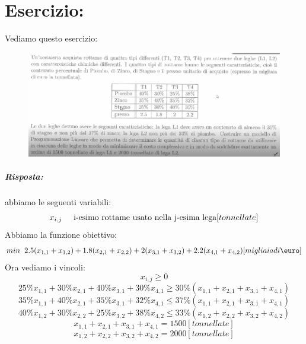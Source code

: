 \section{Esercizio:} 
Vediamo questo esercizio:
\begin{figure}[h!]
    \centering
    \includegraphics[scale=0.5]{Esercizietto.png}
\end{figure}

\subparagraph{Risposta:}
abbiamo le seguenti variabili:
\begin{equation*}
    x_{i,j} \hspace{0.5cm} \text{i-esimo rottame usato nella j-esima lega} [tonnellate]
\end{equation*}
Abbiamo la funzione obiettivo:
\begin{equation*}
    min \hspace{0.2cm} 2.5(x_{1,1} + x_{1,2}) + 1.8(x_{2,1} + x_{2,2}) + 2(x_{3,1} + x_{3,2}) + 2.2(x_{4,1} + x_{4,2}) [migliaia di \euro] 
\end{equation*}
Ora vediamo i vincoli:
\begin{equation*}
    x_{i,j} \geq 0
\end{equation*}
\begin{equation*}
    25\%x_{1,1} + 30\%x_{2,1} + 40\%x_{3,1} + 30\%x_{4,1} \geq 30\%(x_{1,1} + x_{2,1} + x_{3,1} + x_{4,1}) 
\end{equation*}
\begin{equation*}
    35\%x_{1,1} + 40\%x_{2,1} + 35\%x_{3,1} + 32\%x_{4,1} \leq 37\%(x_{1,1} + x_{2,1} + x_{3,1} + x_{4,1}) 
\end{equation*}
\begin{equation*}
    40\%x_{1,2} + 30\%x_{2,2} + 25\%x_{3,2} + 38\%x_{4,2} \leq 33\%(x_{1,2} + x_{2,2} + x_{3,2} + x_{4,2}) 
\end{equation*}
\begin{equation*}
    x_{1,1} + x_{2,1} + x_{3,1} + x_{4,1} = 1500 [tonnellate]
\end{equation*}
\begin{equation*}
    x_{1,2} + x_{2,2} + x_{3,2} + x_{4,2} = 2000 [tonnellate]
\end{equation*}





